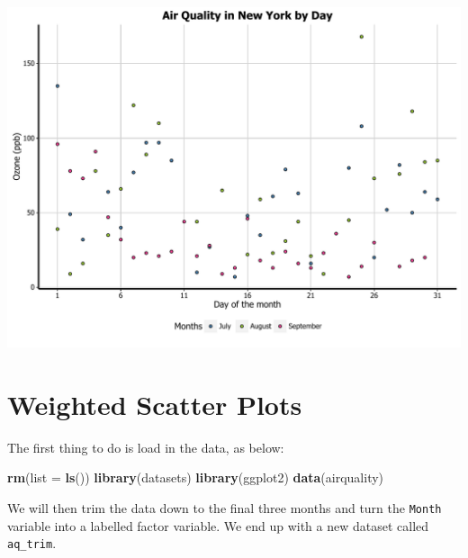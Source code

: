 \documentclass[]{article}
\newenvironment{Shaded}{\begin{snugshade}}{\end{snugshade}}
\newcommand{\KeywordTok}[1]{\textcolor[rgb]{0.13,0.29,0.53}{\textbf{{#1}}}}
\newcommand{\DataTypeTok}[1]{\textcolor[rgb]{0.13,0.29,0.53}{{#1}}}
\newcommand{\DecValTok}[1]{\textcolor[rgb]{0.00,0.00,0.81}{{#1}}}
\newcommand{\StringTok}[1]{\textcolor[rgb]{0.31,0.60,0.02}{{#1}}}
\newcommand{\NormalTok}[1]{{#1}}
\begin{document}
\begin{center}\includegraphics{0_all_posts_pdf/scatter_15-1} \end{center}

\section{Weighted Scatter Plots}\label{weighted-scatter-plots}

The first thing to do is load in the data, as below:

\begin{Shaded}
\begin{Highlighting}[]
\KeywordTok{rm}\NormalTok{(}\DataTypeTok{list =} \KeywordTok{ls}\NormalTok{())}
\KeywordTok{library}\NormalTok{(datasets)}
\KeywordTok{library}\NormalTok{(ggplot2)}
\KeywordTok{data}\NormalTok{(airquality)}
\end{Highlighting}
\end{Shaded}

We will then trim the data down to the final three months and turn the
\texttt{Month} variable into a labelled factor variable. We end up with
a new dataset called \texttt{aq\_trim}.

\begin{Shaded}
\end{Shaded}
\end{document}
